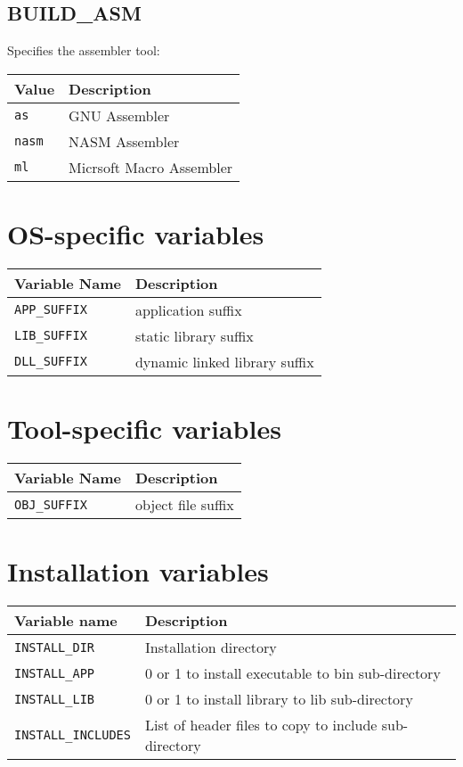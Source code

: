 \documentclass{article}
\newcommand{\var}[1]{{\tt #1}}
\newcommand{\val}[1]{{\tt #1}}
\begin{document}
\subsection{BUILD\_ASM}

Specifies the assembler tool:

\begin{tabular}{ll}
Value      & Description              \\
\hline
\val{as}   & GNU Assembler            \\
\val{nasm} & NASM Assembler           \\
\val{ml}   & Micrsoft Macro Assembler \\
\end{tabular}

\section{OS-specific variables}

\begin{tabular}{ll}
Variable Name    & Description                   \\
\hline
\var{APP\_SUFFIX} & application suffix            \\
\var{LIB\_SUFFIX} & static library suffix         \\
\var{DLL\_SUFFIX} & dynamic linked library suffix \\
\end{tabular}

\section{Tool-specific variables}

\begin{tabular}{ll}
Variable Name    & Description                   \\
\hline
\var{OBJ\_SUFFIX} & object file suffix            \\
\end{tabular}

\section{Installation variables}

\begin{tabular}{ll}
Variable name		& Description		\\
\hline
\var{INSTALL\_DIR}	& Installation directory		\\
\var{INSTALL\_APP}	& 0 or 1 to install executable to bin sub-directory \\
\var{INSTALL\_LIB}	& 0 or 1 to install library to lib sub-directory \\
\var{INSTALL\_INCLUDES} & List of header files to copy to include sub-directory \\
\end{tabular}
\end{document}
